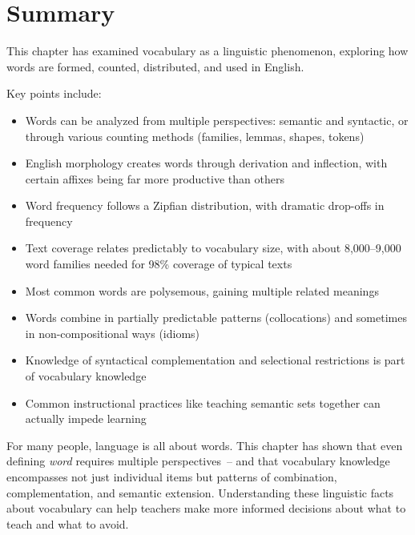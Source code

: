 \section{Summary}

This chapter has examined vocabulary as a linguistic phenomenon, exploring how words are formed, counted, distributed, and used in English.

Key points include:

\begin{itemize}[noitemsep]
\item Words can be analyzed from multiple perspectives: semantic and syntactic, or through various counting methods (families, lemmas, shapes, tokens)
\item English morphology creates words through derivation and inflection, with certain affixes being far more productive than others
\item Word frequency follows a Zipfian distribution, with dramatic drop-offs in frequency
\item Text coverage relates predictably to vocabulary size, with about 8,000--9,000 word families needed for 98\% coverage of typical texts
\item Most common words are polysemous, gaining multiple related meanings
\item Words combine in partially predictable patterns (collocations) and sometimes in non-compositional ways (idioms)
\item Knowledge of syntactical complementation and selectional restrictions is part of vocabulary knowledge
\item Common instructional practices like teaching semantic sets together can actually impede learning
\end{itemize}

For many people, language is all about words. This chapter has shown that even defining \textit{word} requires multiple perspectives~-- and that vocabulary knowledge encompasses not just individual items but patterns of combination, complementation, and semantic extension. Understanding these linguistic facts about vocabulary can help teachers make more informed decisions about what to teach and what to avoid.

